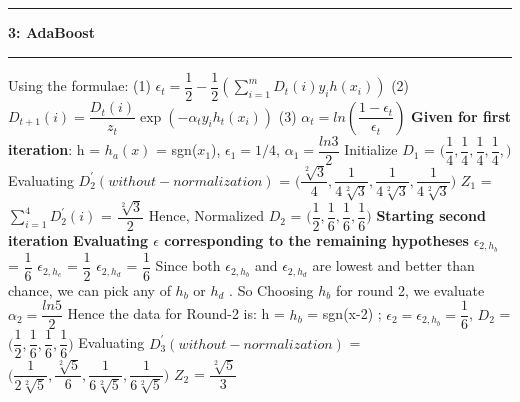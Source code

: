 \documentclass{article}
\newcommand\question[2]{\vspace{.25in}\hrule\textbf{#1: #2}\hrule\vspace{.10in}}
\begin{document}
 \question{3}{AdaBoost}
 Using the formulae: \newline
 (1) $\epsilon_{t} = \dfrac{1}{2} - \dfrac{1}{2}(\sum_{i=1}^m D_{t}(i)y_{i}h(x_{i}))$ \newline
 (2) $D_{t+1}(i) = \dfrac{D_{t}(i)}{z_{t}}\exp(-\alpha_{t}y_{i}h_{t}(x_{i}))$ \newline
 (3) $\alpha_{t} = ln(\dfrac{1-\epsilon_{t}}{\epsilon_{t}})$ \newline
 \textbf {Given for first iteration}: \newline
 h = $h_{a}(x)$ = sgn($x_{1}$), $\epsilon_{1}=1/4$, $\alpha_{1}=\dfrac{ln3}{2}$ \newline
 Initialize $D_{1}$ = $\bigg ( \dfrac{1}{4}, \dfrac{1}{4}, \dfrac{1}{4}, \dfrac{1}{4},\bigg )$ \newline
 Evaluating $D_{2}^\prime (without-normalization)$ = $\bigg ( \dfrac{\sqrt[2]{3}}{4}, \dfrac{1}{4\sqrt[2]{3}}, \dfrac{1}{4\sqrt[2]{3}}, \dfrac{1}{4\sqrt[2]{3}} \bigg )$ \newline
 $Z_{1}$ = $\sum_{i=1}^4 D_{2}^\prime(i)$ = $\dfrac{\sqrt[2]{3}}{2}$ \newline
 Hence, Normalized $D_{2}$ = $\bigg ( \dfrac{1}{2}, \dfrac{1}{6}, \dfrac{1}{6}, \dfrac{1}{6} \bigg )$ \newline
 \textbf {Starting second iteration} \newline
 \textbf {Evaluating $\epsilon$ corresponding to the remaining hypotheses} \newline
 $\epsilon_{2,h_{b}}$ = $\dfrac{1}{6}$ \newline
 $\epsilon_{2,h_{c}}$ = $\dfrac{1}{2}$ \newline
 $\epsilon_{2,h_{d}}$ = $\dfrac{1}{6}$ \newline
 Since both $\epsilon_{2,h_{b}}$ and $\epsilon_{2,h_{d}}$ are lowest and better than chance, we can pick any of $h_{b}$ or $h_{d}$ . So Choosing $h_{b}$ for round 2, we evaluate $\alpha_{2} = \dfrac{ln5}{2}$ \newline
 Hence the data for Round-2 is: \newline
 h = $h_{b}$ = sgn(x-2) ; $\epsilon_{2} = \epsilon_{2,h_{b}} = \dfrac{1}{6}$,  $D_{2}$ = $\bigg ( \dfrac{1}{2}, \dfrac{1}{6}, \dfrac{1}{6}, \dfrac{1}{6} \bigg )$ \newline
 Evaluating $D_{3}^\prime(without-normalization)$ = $\bigg (  \dfrac{1}{2\sqrt[2]{5}}, \dfrac{\sqrt[2]{5}}{6}, \dfrac{1}{6\sqrt[2]{5}}, \dfrac{1}{6\sqrt[2]{5}}  \bigg )$ \newline
 $Z_{2}$ = $\dfrac{\sqrt[2]{5}}{3}$ \newline
\end{document}
